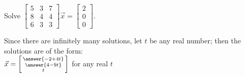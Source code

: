 \documentclass{ximera}
\begin{document}
\begin{exercise}
    Solve
    $\left[ 
        \begin{smallmatrix}
            5 & 3 & 7 \\
            8 & 4 & 4 \\
            6 & 3 & 3
        \end{smallmatrix} 
    \right] 
    \vec{x} =
    \left[ 
        \begin{smallmatrix}
            2 \\
            0 \\
            0
        \end{smallmatrix} 
    \right]$.
    \begin{multipleChoice}
    \end{multipleChoice}
    \begin{problem}
        Since there are infinitely many solutions, let $t$ be any real number; then the solutions are of the form:\\
        $\vec{x} = \left[\begin{smallmatrix} \answer{-2+4t} \\ \answer{4-9t} \\ t \end{smallmatrix}\right]$ for any real $t$
    \end{problem}
\end{exercise}
\end{document}
